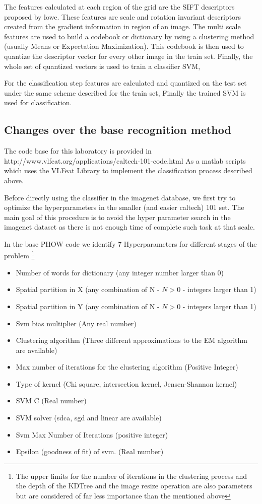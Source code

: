 \documentclass[10pt,twocolumn,letterpaper]{article}
\begin{document}
The features calculated at each region of the grid are the SIFT\cite{Lowe1999} descriptors proposed by lowe. These features are scale and rotation invariant descriptors created from the gradient information in region of an image. The multi scale features are used to build a codebook or dictionary by using a clustering method (usually Means or Expectation Maximization). This codebook is then used to quantize the descriptor vector for every other image in the train set. Finally, the whole set of quantized vectors is used to train a classifier SVM,

For the classification step features are calculated and quantized on the test set under the same scheme described for the train set, Finally the trained SVM is used for classification.
\subsection{Changes over the base recognition method} \label{sssec:num1}
The code base for this laboratory is provided in http://www.vlfeat.org/applications/caltech-101-code.html  As a matlab scripts which uses the VLFeat Library\cite{Vedaldi2010} to implement the classification process described above.

Before directly using the classifier in the imagenet database, we first try to optimize the hyperparameters in the smaller (and easier caltech) 101 set. The main goal of this procedure is to avoid the hyper parameter search in the imagenet dataset as there is not enough time of complete such task at that scale.

In the base PHOW code we identify 7 Hyperparameters for different stages of the problem \footnote{The upper limits for the number of iterations in the clustering process and the depth of the KDTree and the image resize operation are also parameters but are considered of far less importance than the mentioned above}
\begin{itemize}
	\item Number of words for dictionary (any integer number larger than 0)
	\item Spatial partition in X  (any combination of N - $N > 0$ - integers larger than 1)
	\item Spatial partition in Y  (any combination of N - $N > 0$ - integers larger than 1)
	\item Svm bias multiplier (Any real number)
	\item Clustering algorithm  (Three different approximations to the EM algorithm are available)
	\item Max number of iterations for the clustering algorithm (Positive Integer)
	\item Type of kernel (Chi square, intersection  kernel, Jensen-Shannon kernel)
	\item SVM C (Real number)
	\item SVM solver (sdca, sgd and linear are available)
	\item Svm Max Number of Iterations (positive integer)
	\item Epsilon (goodness of fit) of svm. (Real number)
\end{itemize}
\end{document}
